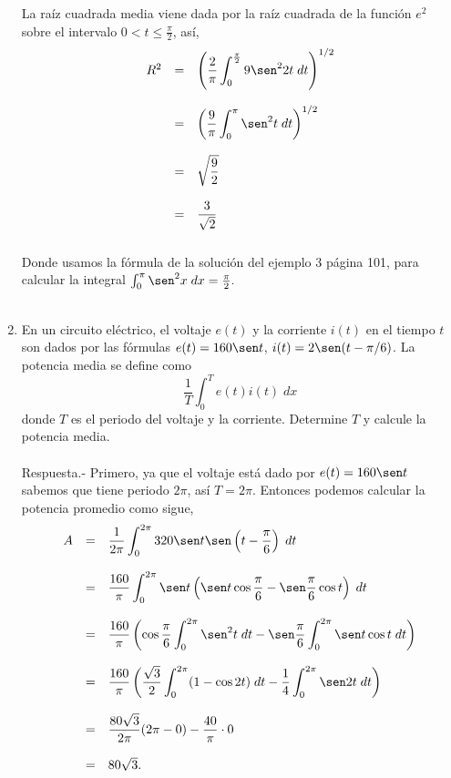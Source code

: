 \begin{enumerate}[\bfseries 1.]
    La raíz cuadrada media viene dada por la raíz cuadrada de la función $e^2$ sobre el intervalo $0<t\leq \frac{\pi}{2}$, así,
    $$\begin{array}{rcl}
	R^2&=&\left(\dfrac{2}{\pi}\displaystyle\int_0^{\frac{\pi}{2}} 9\sen^2 2t\; dt\right)^{1/2}\\\\
	   &=&\left(\dfrac{9}{\pi}\displaystyle\int_0^{\pi} \sen^2 t\; dt\right)^{1/2}\\\\
	   &=&\sqrt{\dfrac{9}{2}}\\\\
	   &=&\dfrac{3}{\sqrt{2}}\\\\
    \end{array}$$
    Donde usamos la fórmula de la solución del ejemplo 3 página 101, para calcular la integral $\int_0^\pi \sen^2 x\; dx = \frac{\pi}{2}.$\\\\


\item En un circuito eléctrico, el voltaje $e(t)$ y la corriente $i(t)$ en el tiempo $t$ son dados por las fórmulas $e(t)=160\sen t$, $i(t)=2\sen (t-\pi/6)$. La potencia media se define como 
    $$\dfrac{1}{T}\int_0^T e(t)i(t)\; dx$$
    donde $T$ es el periodo del voltaje y la corriente. Determine $T$ y calcule la potencia media.\\\\
    Respuesta.-\; Primero, ya que el voltaje está dado por $e(t)=160\sen t$ sabemos que tiene periodo $2\pi$, así $T=2\pi$. Entonces podemos calcular la potencia promedio como sigue,
    $$\begin{array}{rcl}
	A&=&\dfrac{1}{2\pi}\displaystyle\int_0^{2\pi}320\sen t \sen \left(t-\dfrac{\pi}{6}\right)\; dt\\\\
	 &=&\dfrac{160}{\pi}\displaystyle\int_0^{2\pi} \sen t \left(\sen t \cos \dfrac{\pi}{6} - \sen \dfrac{\pi}{6} \cos t\right)\; dt\\\\
	 &=&\dfrac{160}{\pi}\displaystyle \left( \cos \dfrac{\pi}{6} \int_0^{2\pi} \sen^2 t \; dt - \sen\dfrac{\pi}{6} \int_0^{2\pi} \sen t \cos t\; dt \right)\\\\
	 &=&\dfrac{160}{\pi}\displaystyle\left(\dfrac{\sqrt{3}}{2}\int_0^{2\pi} (1-\cos 2t)\; dt - \dfrac{1}{4}\int_0^{2\pi} \sen 2t\; dt \right)\\\\
	 &=&\dfrac{80\sqrt{3}}{2\pi}(2\pi-0)-\dfrac{40}{\pi}\cdot 0\\\\
	 &=&80\sqrt{3}.\\\\
    \end{array}$$

\end{enumerate}


